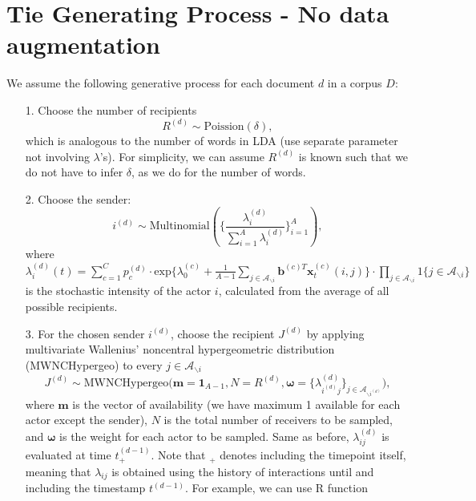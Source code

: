 \documentclass[a4paper]{article}
\begin{document}
\section{Tie Generating Process - No data augmentation}\label{subsec: Tie Generating Process2}
We assume the following generative process for each document $d$ in a corpus $D$:
\begin{itemize}
	\item[1.] Choose the number of recipients
	\begin{equation}
	R^{(d)} \sim \mbox{Poission}(\delta),
	\end{equation}
	which is analogous to the number of words in LDA (use separate parameter not involving $\lambda$'s). For simplicity, we can assume $R^{(d)}$ is known such that we do not have to infer $\delta$, as we do for the number of words. 
	\item[2.] Choose the sender:
	\begin{equation}
i^{(d)} \sim {\mbox{Multinomial}(\{\frac{\lambda_{i}^{(d)}}{\sum_{i=1}^A\lambda_{i}^{(d)}}\}_{i=1}^A)},
	\end{equation}
	where $\lambda^{(d)}_{i}(t)= \sum\limits_{c=1}^{C} p^{(d)}_c\cdot\mbox{exp}\Big\{\lambda^{(c)}_0+\frac{1}{A - 1}\sum\limits_{j \in \mathcal{A}_{\backslash i}} \boldsymbol{b}^{(c)T}\boldsymbol{x}^{(c)}_t(i, j)\Big\}\cdot \prod\limits_{j \in\mathcal{A}_{\backslash i}}1\{j \in \mathcal{A}_{\backslash i}\}$ is the stochastic intensity of the actor $i$, calculated from the average of all possible recipients.
	\item[3.] For the chosen sender $i^{(d)}$, choose the recipient $J^{(d)}$ by applying multivariate Wallenius' noncentral hypergeometric distribution (MWNCHypergeo) to every $j \in \mathcal{A}_{\backslash i}$
	\begin{equation} 
	J^{(d)}\sim \mbox{MWNCHypergeo}\Big(\mathbf{m} =\mathbf{1}_{A-1}, N = R^{(d)}, \boldsymbol{\omega} =\{\lambda_{i^{(d)}j}^{(d)}\}_{j \in \mathcal{A}_{\backslash i^{(d)}}} \Big),
	\end{equation}
	where $\mathbf{m}$ is the vector of availability (we have maximum 1 available for each actor except the sender), $N$ is the total number of receivers to be sampled, and $\boldsymbol{\omega}$ is the weight for each actor to be sampled. Same as before, $\lambda^{(d)}_{ij}$ is evaluated at time $t_+^{(d-1)}$. Note that $_+$ denotes including the timepoint itself, meaning that $\lambda_{ij}$ is obtained using the history of interactions until and including the timestamp $t^{(d-1)}$. For example, we can use R function

\end{itemize}
\end{document}
